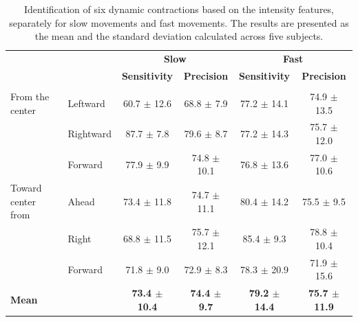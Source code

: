 \begin{table}[h!]
\centering
\caption{Identification of six dynamic contractions based on the intensity features, separately for slow movements and fast movements. The results are presented as the mean and the standard deviation calculated across five subjects.}
\label{tb:4-3}
\begin{tabular}{llcccc}
                   &           & \multicolumn{2}{c}{\textbf{Slow}}          & \multicolumn{2}{c}{\textbf{Fast}}           \\
                   &           & \textbf{Sensitivity} & \textbf{Precision}  & \textbf{Sensitivity} & \textbf{Precision}   \\ \hline
                   &           &                      &                     &                      &                      \\
From the center    & Leftward  & 60.7 $\pm$ 12.6          & 68.8 $\pm$ 7.9          & 77.2 $\pm$ 14.1          & 74.9 $\pm$ 13.5          \\
                   & Rightward & 87.7 $\pm$ 7.8           & 79.6 $\pm$ 8.7          & 77.2 $\pm$ 14.3          & 75.7 $\pm$ 12.0          \\
                   & Forward   & 77.9 $\pm$ 9.9           & 74.8 $\pm$ 10.1         & 76.8 $\pm$ 13.6          & 77.0 $\pm$ 10.6          \\ \hline
Toward center from & Ahead     & 73.4 $\pm$ 11.8          & 74.7 $\pm$ 11.1         & 80.4 $\pm$ 14.2          & 75.5 $\pm$ 9.5           \\
                   & Right     & 68.8 $\pm$ 11.5          & 75.7 $\pm$ 12.1         & 85.4 $\pm$ 9.3           & 78.8 $\pm$ 10.4          \\
                   & Forward   & 71.8 $\pm$ 9.0           & 72.9 $\pm$ 8.3          & 78.3 $\pm$ 20.9          & 71.9 $\pm$ 15.6          \\ \hline
\textbf{Mean}      & \textbf{} & \textbf{73.4 $\pm$ 10.4} & \textbf{74.4 $\pm$ 9.7} & \textbf{79.2 $\pm$ 14.4} & \textbf{75.7 $\pm$ 11.9}
\end{tabular}
\end{table}


